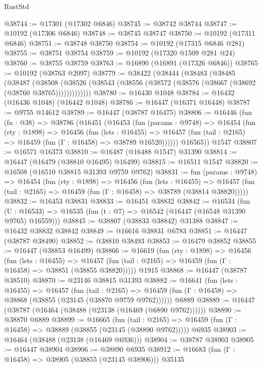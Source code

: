 \begin{lexlean}{RustStd}
\begin{coremodule}
@38744 := @17301 (@17302 @6846)
@38745 := @38742 @38744
@38747 := @10192 (@17306 @6846)
@38748 := @38745 @38747
@38750 := @10192 (@17311 @6846)
@38751 := @38748 @38750
@38754 := @10192 (@17315 @6846 @281)
@38755 := @38751 @38754
@38759 := @10192 (@17320 @1509 @281 @24)
@38760 := @38755 @38759
@38763 := @16890 (@16891 (@17326 @6846))
@38765 := @10192 (@38763 @2097)
@38779 := @38422
    (@38444
      (@38483
        (@38485
          (@38487
            (@38508
              (@38526 (@38543 (@38556 (@38572 (@38576 (@38667 (@38692 (@38760 @38765)))))))))))))
@38780 := @16430 @1048
@38784 := @16432 (@16436 @1048) (@16442 @1048)
@38786 := @16447 (@16371 @16448)
@38787 := @9755 @14612
@38789 := @16447 (@38787 @16475)
@38806 := @16446
    (fun (fn : @38) =>
    @38786
      (@16451
        (@16453
          (fun (params : @9748) =>
          @16454
            (fun (rty : @1898) =>
            @16456
              (fun (lets : @16455) =>
              @16457 (fun (tail : @2165) => @16459 (fun (Γ : @16458) => @38789 @16520))))))
        @16565))
    @1547
@38807 := @16571 @16373
@38810 := @16487 (@16488 @1547) @31390
@38814 := @16447 (@16479 (@38810 @16495) @16499)
@38815 := @16511 @1547
@38820 := @16508 (@16510 @38815 @31393 @9759 @9762)
@38831 := fun (params : @9748) =>
  @16454
    (fun (rty : @1898) =>
    @16456
      (fun (lets : @16455) =>
      @16457 (fun (tail : @2165) => @16459 (fun (Γ : @16458) => @38789 (@38814 @38820)))))
@38832 := @16453 @38831
@38833 := @16451 @38832
@38842 := @16534
    (fun (U : @16533) => @16535 (fun (t : @7) => @16542 (@16447 (@16548 @31390 @9765) @16559)))
@38845 := @38807 (@38833 @38842) @31388
@38847 := @16432 @38832 @38842
@38849 := @16616 @38831 @6783
@38851 := @16447 (@38787 @38490)
@38852 := @38810 @38493
@38853 := @16479 @38852
@38855 := @16447 (@38853 @16499)
@38866 := @16619
    (fun (rty : @1898) =>
    @16456
      (fun (lets : @16455) =>
      @16457 (fun (tail : @2165) => @16459 (fun (Γ : @16458) => @38851 (@38855 @38820)))))
    @1915
@38868 := @16447 (@38787 @38510)
@38870 := @23146 @38815 @31393
@38882 := @16641
    (fun (lets : @16455) =>
    @16457
      (fun (tail : @2165) =>
      @16459 (fun (Γ : @16458) => @38868 (@38855 (@23145 (@38870 @9759 @9762))))))
    @6889
@38889 := @16447 (@38787 (@16464 (@38488 (@23138 (@16469 (@6890 @9762))))))
@38890 := @38870 @6889
@38899 := @16665
    (fun (tail : @2165) => @16459 (fun (Γ : @16458) => @38889 (@38855 (@23145 (@38890 @9762)))))
    @6935
@38903 := @16464 (@38488 (@23138 (@16469 @6936)))
@38904 := @38787 @38903
@38905 := @16447 @38904
@38906 := @38890 @6935
@38912 := @16683 (fun (Γ : @16458) => @38905 (@38855 (@23145 @38906))) @35135

\end{coremodule}
\end{lexlean}
